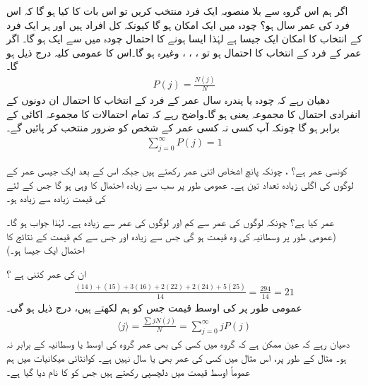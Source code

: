 \quad
اگر ہم اس گروہ سے بلا منصوبہ ایک فرد  منتخب کریں تو اس بات کا کیا  ہو گا کہ اس فرد  کی عمر     سال ہو؟
\quad
چودہ میں ایک امکان  ہو گا کیونکہ کل   افراد  ہیں اور ہر ایک فرد کے انتخاب کا امکان ایک جیسا ہے لہٰذا ایسا ہونے کا احتمال چودہ میں سے ایک ہو گا۔  اگر   عمر کے  فرد کے انتخاب کا احتمال ہو تو  ، ، ، وغیرہ ہو گا۔اس کا عمومی کلیہ درج ذیل ہو گا۔
\begin{align}
P(j) = \frac{N(j)}{N} 
\end{align}
دھیان رہے کہ  چودہ یا پندرہ سال عمر کے فرد  کے انتخاب کا احتمال ان دونوں کے  انفرادی احتمال کا مجموعہ یعنی  ہو گا۔واضح رہے کہ  تمام احتمالات کا مجموعہ اکائی  کے برابر ہو گا چونکہ آپ کسی نہ کسی عمر کے شخص کو ضرور منتخب کر پائیں گے۔ 
\begin{align}\label{مساوات_تفاعل_موج_کل_احتمال_اکائی}
\sum_{j=0}^{\infty} P(j) = 1
\end{align}

\quad
کونسی عمر     ہے؟
 \quad 
{}،  چونکہ پانچ اشخاص اتنی عمر رکھتے ہیں جبکہ اس کے بعد ایک جیسی عمر کے لوگوں کی اگلی زیادہ  تعداد تین ہے۔ عمومی طور پر سب سے زیادہ احتمال کا  وہی  ہو گا جس کے لئے کی قیمت زیادہ سے زیادہ ہو۔ 

  عمر کیا ہے؟  \quad
چونکہ  لوگوں  کی عمر  سے کم اور  لوگوں  کی  عمر  سے زیادہ ہے۔  لہٰذا  جواب  ہو گا۔ (عمومی طور پر وسطانیہ  کی وہ قیمت ہو گی جس سے زیادہ  اور جس سے کم قیمت کے نتائج کا احتمال  ایک  جیسا ہو۔)

\quad
ان  کی   عمر کتنی ہے ؟ 
\begin{align*}
 \frac{(14)+(15)+3(16)+2(22)+2(24)+5(25)}{14} = \frac{294}{14}=21 
\end{align*}
عمومی طور پر  کی اوسط قیمت جس کو ہم   لکھتے ہیں، درج ذیل ہو گی۔ 
\begin{align}\label{مساوات_تفاعل_موج_اوسط}
\langle j \rangle = \frac{\sum  j N(j)}{N} = \sum_{j=0}^{\infty} jP(j) 
\end{align}
دھیان رہے کہ عین ممکن ہے کہ گروہ میں کسی کی بھی عمر گروہ کی اوسط یا وسطانیہ  کے برابر نہ ہو۔ مثال کے طور پر،  اس مثال میں کسی کی عمر بھی   یا  سال نہیں ہے۔ کوانٹائی میکانیات میں ہم عموماً اوسط قیمت میں دلچسپی رکھتے ہیں جس کو   کا نام دیا گیا ہے۔ 

